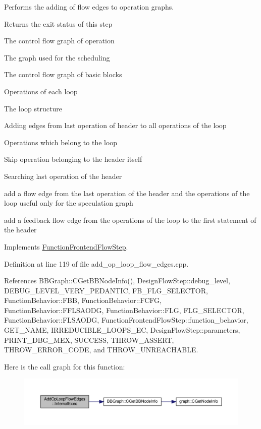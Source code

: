 Performs the adding of flow edges to operation graphs. 

\begin{DoxyReturn}{Returns}
the exit status of this step 
\end{DoxyReturn}
The control flow graph of operation

The graph used for the scheduling

The control flow graph of basic blocks

Operations of each loop

The loop structure

Adding edges from last operation of header to all operations of the loop

Operations which belong to the loop

Skip operation belonging to the header itself

Searching last operation of the header

add a flow edge from the last operation of the header and the operations of the loop useful only for the speculation graph

add a feedback flow edge from the operations of the loop to the first statement of the header 

Implements \hyperlink{classFunctionFrontendFlowStep_a00612f7fb9eabbbc8ee7e39d34e5ac68}{Function\+Frontend\+Flow\+Step}.



Definition at line 119 of file add\+\_\+op\+\_\+loop\+\_\+flow\+\_\+edges.\+cpp.



References B\+B\+Graph\+::\+C\+Get\+B\+B\+Node\+Info(), Design\+Flow\+Step\+::debug\+\_\+level, D\+E\+B\+U\+G\+\_\+\+L\+E\+V\+E\+L\+\_\+\+V\+E\+R\+Y\+\_\+\+P\+E\+D\+A\+N\+T\+IC, F\+B\+\_\+\+F\+L\+G\+\_\+\+S\+E\+L\+E\+C\+T\+OR, Function\+Behavior\+::\+F\+BB, Function\+Behavior\+::\+F\+C\+FG, Function\+Behavior\+::\+F\+F\+L\+S\+A\+O\+DG, Function\+Behavior\+::\+F\+LG, F\+L\+G\+\_\+\+S\+E\+L\+E\+C\+T\+OR, Function\+Behavior\+::\+F\+L\+S\+A\+O\+DG, Function\+Frontend\+Flow\+Step\+::function\+\_\+behavior, G\+E\+T\+\_\+\+N\+A\+ME, I\+R\+R\+E\+D\+U\+C\+I\+B\+L\+E\+\_\+\+L\+O\+O\+P\+S\+\_\+\+EC, Design\+Flow\+Step\+::parameters, P\+R\+I\+N\+T\+\_\+\+D\+B\+G\+\_\+\+M\+EX, S\+U\+C\+C\+E\+SS, T\+H\+R\+O\+W\+\_\+\+A\+S\+S\+E\+RT, T\+H\+R\+O\+W\+\_\+\+E\+R\+R\+O\+R\+\_\+\+C\+O\+DE, and T\+H\+R\+O\+W\+\_\+\+U\+N\+R\+E\+A\+C\+H\+A\+B\+LE.

Here is the call graph for this function\+:
\nopagebreak
\begin{figure}[H]
\begin{center}
\leavevmode
\includegraphics[width=350pt]{da/d87/classAddOpLoopFlowEdges_ac2f9ac00b5800bea8a2167e12f7c9474_cgraph}
\end{center}
\end{figure}


